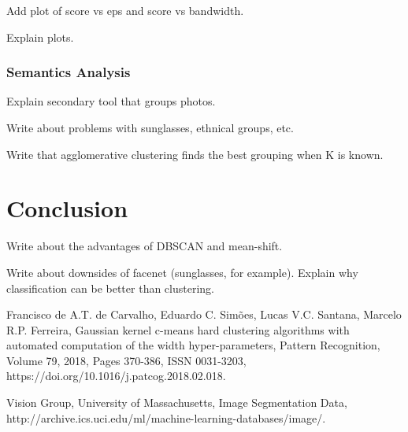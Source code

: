 \documentclass[conference]{IEEEtran}
\begin{document}
Add plot of score vs eps and score vs bandwidth.

Explain plots.

\subsubsection{Semantics Analysis}

Explain secondary tool that groups photos.

Write about problems with sunglasses, ethnical groups, etc.

Write that agglomerative clustering finds the best grouping when K is known.

\section{Conclusion}

Write about the advantages of DBSCAN and mean-shift.

Write about downsides of facenet (sunglasses, for example).
Explain why classification can be better than clustering.

\begin{thebibliography}{00}
 Francisco de A.T. de Carvalho, Eduardo C. Simões, Lucas V.C. Santana, Marcelo R.P. Ferreira,
Gaussian kernel c-means hard clustering algorithms with automated computation of the width hyper-parameters,
Pattern Recognition,
Volume 79,
2018,
Pages 370-386,
ISSN 0031-3203,
https://doi.org/10.1016/j.patcog.2018.02.018.

 Vision Group, University of Massachusetts, 
Image Segmentation Data,
http://archive.ics.uci.edu/ml/machine-learning-databases/image/.

\end{thebibliography}
\end{document}
